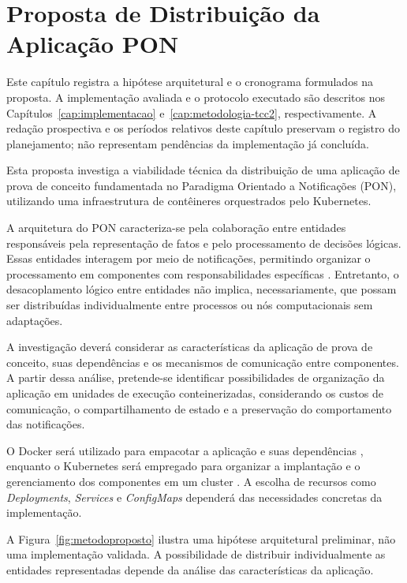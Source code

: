 \chapter{Proposta de Distribuição da Aplicação PON}
\label{cap:proposta}

Este capítulo registra a hipótese arquitetural e o cronograma formulados na proposta. A implementação avaliada e o protocolo executado são descritos nos Capítulos~\ref{cap:implementacao} e~\ref{cap:metodologia-tcc2}, respectivamente. A redação prospectiva e os períodos relativos deste capítulo preservam o registro do planejamento; não representam pendências da implementação já concluída.

Esta proposta investiga a viabilidade técnica da distribuição de uma aplicação de prova de conceito fundamentada no Paradigma Orientado a Notificações (PON), utilizando uma infraestrutura de contêineres orquestrados pelo Kubernetes.

A arquitetura do PON caracteriza-se pela colaboração entre entidades responsáveis pela representação de fatos e pelo processamento de decisões lógicas. Essas entidades interagem por meio de notificações, permitindo organizar o processamento em componentes com responsabilidades específicas \cite{kossoski2024applsci,kossoski2024tese}. Entretanto, o desacoplamento lógico entre entidades não implica, necessariamente, que possam ser distribuídas individualmente entre processos ou nós computacionais sem adaptações.

A investigação deverá considerar as características da aplicação de prova de conceito, suas dependências e os mecanismos de comunicação entre componentes. A partir dessa análise, pretende-se identificar possibilidades de organização da aplicação em unidades de execução conteinerizadas, considerando os custos de comunicação, o compartilhamento de estado e a preservação do comportamento das notificações.

O Docker será utilizado para empacotar a aplicação e suas dependências \cite{docker2026documentation}, enquanto o Kubernetes será empregado para organizar a implantação e o gerenciamento dos componentes em um cluster \cite{kubernetes2026documentation}. A escolha de recursos como \textit{Deployments}, \textit{Services} e \textit{ConfigMaps} dependerá das necessidades concretas da implementação.

A Figura~\ref{fig:metodoproposto} ilustra uma hipótese arquitetural preliminar, não uma implementação validada. A possibilidade de distribuir individualmente as entidades representadas depende da análise das características da aplicação.

